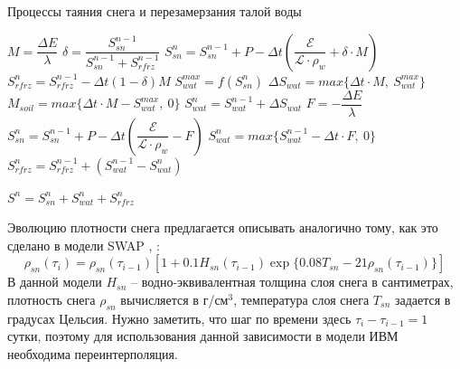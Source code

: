 \documentclass[a4paper, fontsize=14pt]{scrartcl}
\begin{document}
\begin{algorithm}[H]
\caption{Процессы таяния снега и перезамерзания талой воды}
\label{alg:setup}
\begin{algorithmic}[]
        \State $ M = \dfrac{\Delta E}{\lambda} $ 
        \State $ \delta = \dfrac{S_{sn}^{n-1}}{S_{sn}^{n-1} + S_{rfrz}^{n - 1}}$ 
        \State $ S_{sn}^n = S_{sn}^{n-1} + P - \Delta t \left( \dfrac{\mathcal{E}}{\mathcal{L} \cdot \rho_w} + \delta \cdot M \right) $ 
        \State $ S_{rfrz}^n = S_{rfrz}^{n - 1} - \Delta t (1 - \delta)M $ 
        \State $ S_{wat}^{max} = f( S_{sn}^n ) $
        \State $ \Delta S_{wat} = max\{\Delta t \cdot M, ~S_{wat}^{max}\} $ 
        \State $ M_{soil} = max\{\Delta t \cdot M - S_{wat}^{max}, ~0\} $ 
        \State $ S_{wat}^n = S_{wat}^{n-1} + \Delta S_{wat} $ 
    \Else
            \State $F = -\dfrac{\Delta E}{\lambda}$
            \State $S_{sn}^n = S_{sn}^{n-1} + P - \Delta t \left( \dfrac{\mathcal{E}}{\mathcal{L} \cdot \rho_w} - F \right)$
            \State $S_{wat}^n = max\{ S_{wat}^{n-1} - \Delta t \cdot F, ~0\}$
            \State $S_{rfrz}^n = S_{rfrz}^{n - 1} + ( S_{wat}^{n-1} - S_{wat}^n )$
            
        \EndIf
    \EndIf
    \State $S^n = S_{sn}^n + S_{wat}^n + S_{rfrz}^n$
\end{algorithmic}
\end{algorithm}

Эволюцию плотности снега предлагается описывать аналогично тому, как это сделано в модели SWAP \cite{Gusev2002}, \cite{YOSIDA1955}:
\begin{equation}
    \rho_{sn}(\tau_i) = \rho_{sn}(\tau_{i-1}) \left[  1 + 0.1 H_{sn}(\tau_{i-1}) \exp \{ 0.08 T_{sn} - 21 \rho_{sn}(\tau_{i-1})  \} \right]    \label{sysRHOOLD}  
\end{equation}
В данной модели $H_{sn}$ -- водно-эквивалентная толщина слоя снега в сантиметрах, плотность снега $\rho_{sn}$ вычисляется в г/см$^3$, температура слоя снега $T_{sn}$ задается в градусах Цельсия. Нужно заметить, что шаг по времени здесь $\tau_{i} - \tau_{i-1} = 1$ сутки, поэтому для использования данной зависимости в модели ИВМ необходима переинтерполяция.
\end{document}
